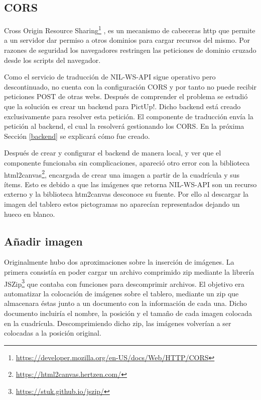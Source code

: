 \subsection{CORS}

Cross Origin Resource Sharing\footnote{\url{https://developer.mozilla.org/en-US/docs/Web/HTTP/CORS}}  , es un mecanismo de cabeceras http que permite a un servidor dar permiso a otros dominios para cargar recursos del mismo. Por razones de seguridad los navegadores restringen las peticiones de dominio cruzado desde los scripts del navegador. 


Como el servicio de traducción de NIL-WS-API sigue operativo pero descontinuado, no cuenta con la configuración CORS y por tanto no puede recibir peticiones POST de otras webs. Después de comprender el problema se estudió que la solución es crear un backend para PictUp!. Dicho backend está creado exclusivamente para resolver esta petición. El componente de traducción envía la petición al backend, el cual la resolverá gestionando los CORS. En la próxima Sección \ref{backend} se explicará cómo fue creado. 


Después de crear y configurar el backend de manera local, y ver que el componente funcionaba sin complicaciones, apareció otro error con la biblioteca html2canvas\footnote{\url{https://html2canvas.hertzen.com/}}, encargada de crear una imagen a partir de la cuadrícula y sus ítems. Esto es debido a que las imágenes que retorna NIL-WS-API son un recurso externo y la biblioteca htm2canvas desconoce su fuente. Por ello al descargar la imagen del tablero estos pictogramas no aparecían representados dejando un hueco en blanco.


\subsection{Añadir imagen}
\label{cap5:addImageCut}

Originalmente hubo dos aproximaciones sobre la inserción de imágenes. La primera consistía en poder cargar un archivo comprimido zip mediante la librería JSZip\footnote{\url{https://stuk.github.io/jszip/}} que contaba con funciones para descomprimir archivos. El objetivo era automatizar la colocación de imágenes sobre el tablero, mediante un zip que almacenara éstas junto a un documento con la información de cada una. Dicho documento incluiría el nombre, la posición y el tamaño de cada imagen colocada en la cuadrícula. Descomprimiendo dicho zip, las imágenes volverían a ser colocadas a la posición original.

